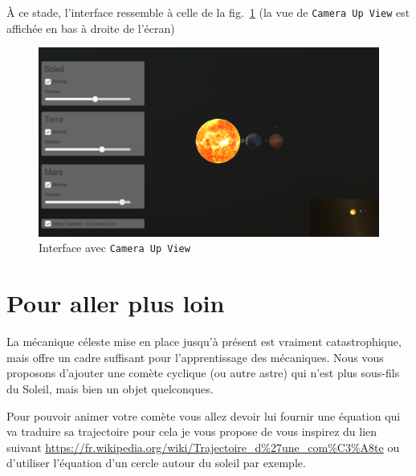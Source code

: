 \documentclass[a4paper,10pt]{article}
\begin{document}
À ce stade, l'interface ressemble à celle de la fig.~\ref{fig:camera-haut} (la vue de \texttt{Camera Up View} est affichée en bas à droite de l'écran)
\begin{figure}[h]
		\begin{center}
			\includegraphics[scale=.50]{fig/camera-haut}
			\caption{Interface avec \texttt{Camera Up View}}
			\label{fig:camera-haut}
		\end{center}
\end{figure}

\fi 
	

\section{Pour aller plus loin}

La mécanique céleste mise en place jusqu'à présent est vraiment catastrophique, mais offre un cadre suffisant pour l'apprentissage des mécaniques. Nous vous proposons d'ajouter une comète cyclique (ou autre astre) qui n'est plus sous-fils du Soleil, mais bien un objet quelconques.

Pour pouvoir animer votre comète vous allez devoir lui fournir une équation qui va traduire sa trajectoire pour cela je vous propose de vous inspirez du lien suivant \url{https://fr.wikipedia.org/wiki/Trajectoire_d%27une_com%C3%A8te}
ou d'utiliser l'équation d'un cercle autour du soleil par exemple.
\end{document}
